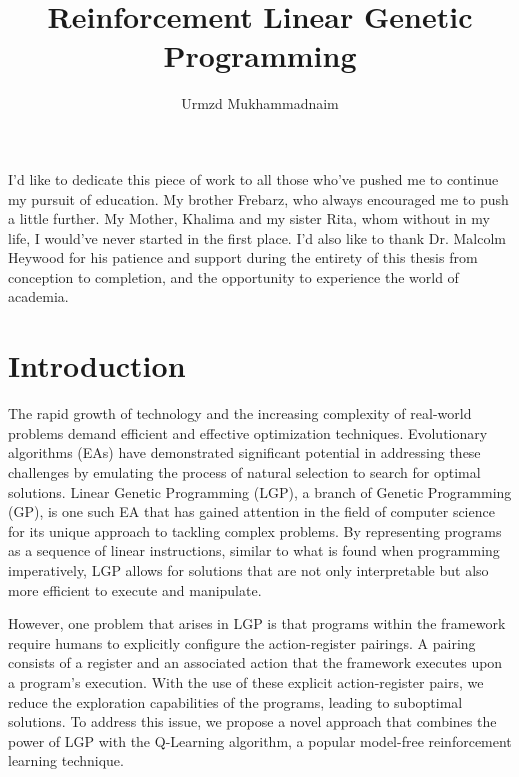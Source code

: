 \documentclass[12pt, final]{dalcsthesis}
\begin{document}
\bcshon
\title{Reinforcement Linear Genetic Programming}
\author{Urmzd Mukhammadnaim}

\reader{}

\nolistoftables
\nolistoffigures

\frontmatter

\nocite{*}

\begin{abstract}
\end{abstract}

\begin{acknowledgements}
	I'd like to dedicate this piece of work to all those who've pushed me to continue my
	pursuit of education. My brother Frebarz, who always encouraged me to push a little further. My Mother, Khalima and my sister Rita, whom without in my life, I would've never started in the first place. I'd also like to thank Dr. Malcolm Heywood for
	his patience and support during the entirety of this thesis from conception to completion, and the opportunity to experience the world of academia.
\end{acknowledgements}

\mainmatter

\chapter{Introduction}
The rapid growth of technology and the increasing complexity of real-world problems demand efficient and effective optimization techniques. Evolutionary algorithms (EAs) have demonstrated significant potential in addressing these challenges by emulating the process of natural selection to search for optimal solutions. Linear Genetic Programming (LGP), a branch of Genetic Programming (GP), is one such EA that has gained attention in the field of computer science for its unique approach to tackling complex problems. By representing programs as a sequence of linear instructions, similar to what is found when programming imperatively, LGP allows for solutions that are not only interpretable but also more efficient to execute and manipulate.

However, one problem that arises in LGP is that programs within the framework require humans to explicitly configure the action-register pairings. A pairing consists of a register and an associated action that the framework executes upon a program's execution. With the use of these explicit action-register pairs, we reduce the exploration capabilities of the programs, leading to suboptimal solutions. To address this issue, we propose a novel approach that combines the power of LGP with the Q-Learning algorithm, a popular model-free reinforcement learning technique.
\end{document}
